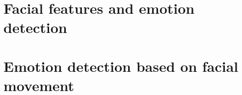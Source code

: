 \section{Facial features and emotion detection}

\section{Emotion detection based on facial movement}
